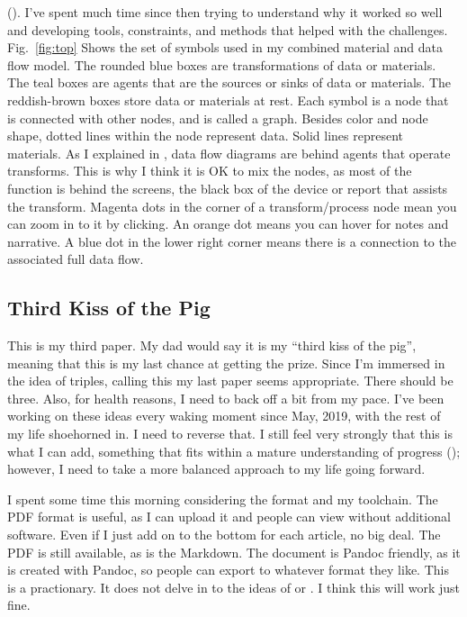 (). I've spent
much time since then trying to understand why it worked so well and
developing tools, constraints, and methods that helped with the
challenges. Fig.~\ref{fig:top} Shows the set of symbols used in my
combined material and data flow model. The rounded blue boxes are
transformations of data or materials. The teal boxes are agents that are
the sources or sinks of data or materials. The reddish-brown boxes store
data or materials at rest. Each symbol is a node that is connected with
other nodes, and is called a graph. Besides color and node shape, dotted
lines within the node represent data. Solid lines represent materials.
As I explained in \trs, data flow diagrams are behind agents that
operate transforms. This is why I think it is OK to mix the nodes, as
most of the function is behind the screens, the black box of the device
or report that assists the transform. Magenta dots in the corner of a
transform/process node mean you can zoom in to it by clicking. An orange
dot means you can hover for notes and narrative. A blue dot in the lower
right corner means there is a connection to the associated full data
flow.

\subsection{Third Kiss of the Pig}\label{third-kiss-of-the-pig}

This is my third paper. My dad would say it is my ``third kiss of the
pig'', meaning that this is my last chance at getting the prize. Since
I'm immersed in the idea of triples, calling this my last paper seems
appropriate. There should be three. Also, for health reasons, I need to
back off a bit from my pace. I've been working on these ideas every
waking moment since May, 2019, with the rest of my life shoehorned in. I
need to reverse that. I still feel very strongly that this is what I can
add, something that fits within a mature understanding of progress
(); however, I need
to take a more balanced approach to my life going forward.

I spent some time this morning considering the format and my toolchain.
The PDF format is useful, as I can upload it and people can view without
additional software. Even if I just add on to the bottom for each
article, no big deal. The PDF is still available, as is the Markdown.
The document is Pandoc friendly, as it is created with Pandoc, so people
can export to whatever format they like. This is a practionary. It does
not delve in to the ideas of \trs or \tsa. I think this will work just
fine.

